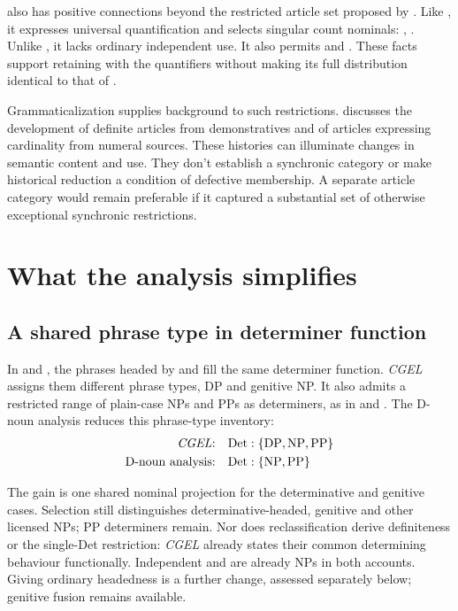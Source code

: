 \documentclass[12pt]{article}
\begin{document}
 also has positive connections beyond the restricted article set proposed by \textcite{spinillo2004reconceptualising}. Like , it expresses universal quantification and selects singular count nominals: , . Unlike , it lacks ordinary independent use. It also permits  and . These facts support retaining  with the quantifiers without making its full distribution identical to that of .

Grammaticalization supplies background to such restrictions. \textcite[331--336]{lyons1999} discusses the development of definite articles from demonstratives and of articles expressing cardinality from numeral sources. These histories can illuminate changes in semantic content and use. They don't establish a synchronic category or make historical reduction a condition of defective membership. A separate article category would remain preferable if it captured a substantial set of otherwise exceptional synchronic restrictions.

\section{What the analysis simplifies}\label{sec:economy}

\subsection{A shared phrase type in determiner function}\label{sec:det-uniform}

In  and , the phrases headed by  and  fill the same determiner function. \textit{CGEL} assigns them different phrase types, DP and genitive NP. It also admits a restricted range of plain-case NPs and PPs as determiners, as in  and  \citep[Ch.~5, §4]{huddleston2002}. The D-noun analysis reduces this phrase-type inventory:
\[
\begin{aligned}
\text{\textit{CGEL}:} &\quad \mathrm{Det}:\{\mathrm{DP},\mathrm{NP},\mathrm{PP}\} \\
\text{D-noun analysis:} &\quad \mathrm{Det}:\{\mathrm{NP},\mathrm{PP}\}
\end{aligned}
\]

The gain is one shared nominal projection for the determinative and genitive cases. Selection still distinguishes determinative-headed, genitive and other licensed NPs; PP determiners remain. Nor does reclassification derive definiteness or the single-Det restriction: \textit{CGEL} already states their common determining behaviour functionally. Independent  and  are already NPs in both accounts. Giving  ordinary headedness is a further change, assessed separately below; genitive fusion remains available.
\end{document}
